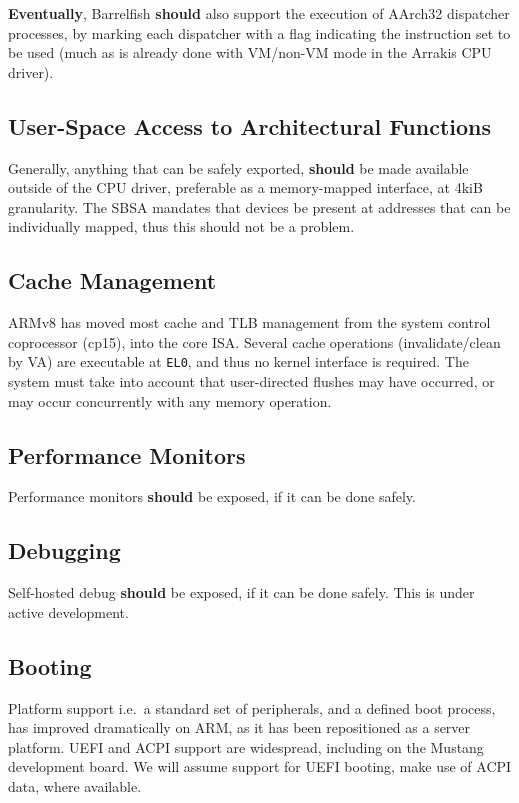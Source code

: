 \documentclass[a4paper,twoside]{report}
\begin{document}
\textbf{Eventually}, Barrelfish \textbf{should} also support the execution of
AArch32 dispatcher processes, by marking each dispatcher with a flag
indicating the instruction set to be used (much as is already done with
VM/non-VM mode in the Arrakis CPU driver).

\subsection{User-Space Access to Architectural Functions}

Generally, anything that can be safely exported, \textbf{should} be made
available outside of the CPU driver, preferable as a memory-mapped interface,
at 4kiB granularity. The SBSA mandates that devices be present at addresses
that can be individually mapped, thus this should not be a problem.

\subsection{Cache Management}

ARMv8 has moved most cache and TLB management from the system control
coprocessor (cp15), into the core ISA. Several cache operations
(invalidate/clean by VA) are executable at \texttt{EL0}, and thus no kernel
interface is required. The system must take into account that user-directed
flushes may have occurred, or may occur concurrently with any memory
operation.

\subsection{Performance Monitors}

Performance monitors \textbf{should} be exposed, if it can be done safely.

\subsection{Debugging}

Self-hosted debug \textbf{should} be exposed, if it can be done safely. This
is under active development.

\subsection{Booting}

Platform support i.e.~a standard set of peripherals, and a defined boot
process, has improved dramatically on ARM, as it has been repositioned as a
server platform. UEFI and ACPI support are widespread, including on the
Mustang development board. We will assume support for UEFI booting, make use
of ACPI data, where available.
\end{document}
